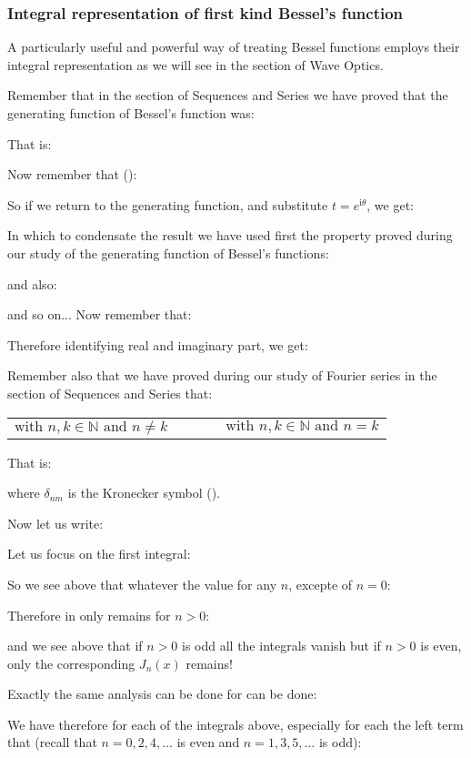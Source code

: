 	\subsubsection{Integral representation of first kind Bessel's function}
	A particularly useful and powerful way of treating Bessel functions employs their integral representation as we will see in the section of Wave Optics.
	
	Remember that in the section of Sequences and Series we have proved that the generating function of Bessel's function was:
	
	That is:
	
	Now remember that ():
	
	So if we return to the generating function, and substitute $t=e^{\mathrm{i}\theta}$, we get:
	
	In which to condensate the result we have used first the property proved during our study of the generating function of Bessel's functions:
	
	and also:
	
	and so on...
	Now remember that:
	
	Therefore identifying real and imaginary part, we get:
	
	Remember also that we have proved during our study of Fourier series in the section of Sequences and Series that:
	
	\begin{center}
	\begin{tabular}{ccc}
	$\text{with }n,k\in \mathbb{N}\text{ and }n\ne k$
	&$\qquad$&
	$\text{with }n,k\in \mathbb{N}\text{ and }n = k$
	\end{tabular}
	\end{center}
	That is:
	
	where $\delta_{nm}$ is the Kronecker symbol ().
	
	Now let us write:
	
	Let us focus on the first integral:
	
	So we see above that whatever the value for any $n$, excepte of $n=0$:
	
	Therefore in only remains for $n>0$:
	
	and we see above that if $n>0$ is odd all the integrals vanish but if $n>0$ is even, only the corresponding $J_n(x)$ remains!
	
	Exactly the same analysis can be done for can be done:
	
	We have therefore for each of the integrals above, especially for each the left term that (recall that $n=0,2,4,\ldots$ is even and $n=1,3,5,\ldots$ is odd):
	
